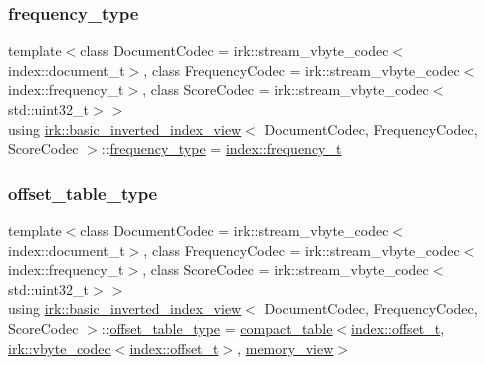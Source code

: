 \mbox{\label{classirk_1_1basic__inverted__index__view_a01218db8d72e7ee07f3a9f71225f03c8}} 
\subsubsection{\texorpdfstring{frequency\+\_\+type}{frequency\_type}}
{\footnotesize\ttfamily template$<$class Document\+Codec  = irk\+::stream\+\_\+vbyte\+\_\+codec$<$index\+::document\+\_\+t$>$, class Frequency\+Codec  = irk\+::stream\+\_\+vbyte\+\_\+codec$<$index\+::frequency\+\_\+t$>$, class Score\+Codec  = irk\+::stream\+\_\+vbyte\+\_\+codec$<$std\+::uint32\+\_\+t$>$$>$ \\
using \mbox{\hyperlink{classirk_1_1basic__inverted__index__view}{irk\+::basic\+\_\+inverted\+\_\+index\+\_\+view}}$<$ Document\+Codec, Frequency\+Codec, Score\+Codec $>$\+::\mbox{\hyperlink{classirk_1_1basic__inverted__index__view_a01218db8d72e7ee07f3a9f71225f03c8}{frequency\+\_\+type}} =  \mbox{\hyperlink{namespaceirk_1_1index_aa2cb48e79abd95deb25bbdf36c0ea70f}{index\+::frequency\+\_\+t}}}

\mbox{\label{classirk_1_1basic__inverted__index__view_ad9f3d11fa37ab4d1ce1b47a579466589}} 
\subsubsection{\texorpdfstring{offset\+\_\+table\+\_\+type}{offset\_table\_type}}
{\footnotesize\ttfamily template$<$class Document\+Codec  = irk\+::stream\+\_\+vbyte\+\_\+codec$<$index\+::document\+\_\+t$>$, class Frequency\+Codec  = irk\+::stream\+\_\+vbyte\+\_\+codec$<$index\+::frequency\+\_\+t$>$, class Score\+Codec  = irk\+::stream\+\_\+vbyte\+\_\+codec$<$std\+::uint32\+\_\+t$>$$>$ \\
using \mbox{\hyperlink{classirk_1_1basic__inverted__index__view}{irk\+::basic\+\_\+inverted\+\_\+index\+\_\+view}}$<$ Document\+Codec, Frequency\+Codec, Score\+Codec $>$\+::\mbox{\hyperlink{classirk_1_1basic__inverted__index__view_ad9f3d11fa37ab4d1ce1b47a579466589}{offset\+\_\+table\+\_\+type}} =  \mbox{\hyperlink{classirk_1_1compact__table}{compact\+\_\+table}}$<$\mbox{\hyperlink{namespaceirk_1_1index_ad66c0e72549ffc6b78a85158293bb47b}{index\+::offset\+\_\+t}}, \mbox{\hyperlink{structirk_1_1vbyte__codec}{irk\+::vbyte\+\_\+codec}}$<$\mbox{\hyperlink{namespaceirk_1_1index_ad66c0e72549ffc6b78a85158293bb47b}{index\+::offset\+\_\+t}}$>$, \mbox{\hyperlink{classirk_1_1memory__view}{memory\+\_\+view}}$>$}

